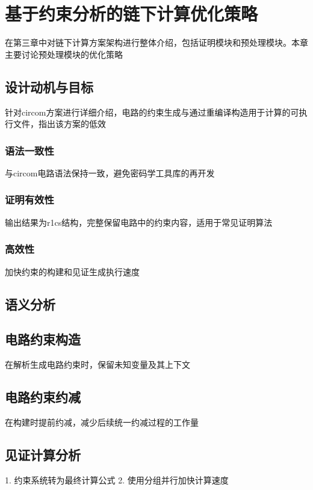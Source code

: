 \chapter{基于约束分析的链下计算优化策略}
在第三章中对链下计算方案架构进行整体介绍，包括证明模块和预处理模块。本章主要讨论预处理模块的优化策略

\section{设计动机与目标}
针对circom方案进行详细介绍，电路的约束生成与通过重编译构造用于计算的可执行文件，指出该方案的低效

\subsection{语法一致性}
与circom电路语法保持一致，避免密码学工具库的再开发

\subsection{证明有效性}
输出结果为r1cs结构，完整保留电路中的约束内容，适用于常见证明算法

\subsection{高效性}
加快约束的构建和见证生成执行速度

\section{语义分析}

\section{电路约束构造}
在解析生成电路约束时，保留未知变量及其上下文

\section{电路约束约减}
在构建时提前约减，减少后续统一约减过程的工作量

\section{见证计算分析}
1. 约束系统转为最终计算公式
2. 使用分组并行加快计算速度
